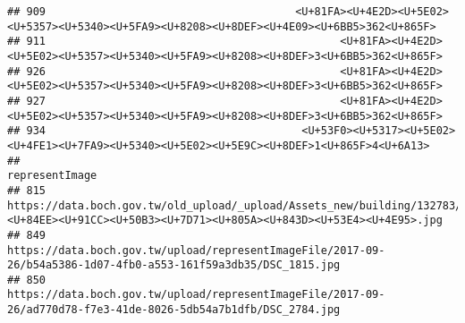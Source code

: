 \documentclass[
]{article}
\begin{document}
\begin{verbatim}
## 909                                       <U+81FA><U+4E2D><U+5E02><U+5357><U+5340><U+5FA9><U+8208><U+8DEF><U+4E09><U+6BB5>362<U+865F>
## 911                                              <U+81FA><U+4E2D><U+5E02><U+5357><U+5340><U+5FA9><U+8208><U+8DEF>3<U+6BB5>362<U+865F>
## 926                                              <U+81FA><U+4E2D><U+5E02><U+5357><U+5340><U+5FA9><U+8208><U+8DEF>3<U+6BB5>362<U+865F>
## 927                                              <U+81FA><U+4E2D><U+5E02><U+5357><U+5340><U+5FA9><U+8208><U+8DEF>3<U+6BB5>362<U+865F>
## 934                                        <U+53F0><U+5317><U+5E02><U+4FE1><U+7FA9><U+5340><U+5E02><U+5E9C><U+8DEF>1<U+865F>4<U+6A13>
##                                                                                                                                                                                                                                                                                                                                                                                                                                                                                                 representImage
## 815                                                                                                                                                                                                                                                                                                                                                  https://data.boch.gov.tw/old_upload/_upload/Assets_new/building/132783/photo/<U+7AF9><U+84EE><U+91CC><U+50B3><U+7D71><U+805A><U+843D><U+53E4><U+4E95>.jpg
## 849                                                                                                                                                                                                                                                                                                                                                                                            https://data.boch.gov.tw/upload/representImageFile/2017-09-26/b54a5386-1d07-4fb0-a553-161f59a3db35/DSC_1815.jpg
## 850                                                                                                                                                                                                                                                                                                                                                                                            https://data.boch.gov.tw/upload/representImageFile/2017-09-26/ad770d78-f7e3-41de-8026-5db54a7b1dfb/DSC_2784.jpg

\end{verbatim}
\end{document}
